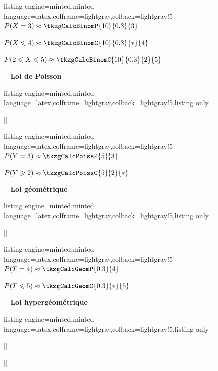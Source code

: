 \documentclass[11pt,a4paper]{ltxdoc}
\begin{document}
\begin{tcblisting}{listing engine=minted,minted language=latex,colframe=lightgray,colback=lightgray!5}
$P(X=3) \approx \tkzgCalcBinomP{10}{0.3}{3}$

$P(X \leqslant 4) \approx \tkzgCalcBinomC{10}{0.3}{*}{4}$

$P(2 \leqslant X \leqslant 5) \approx \tkzgCalcBinomC{10}{0.3}{2}{5}$
\end{tcblisting}

\textbf{-- Loi de Poisson}

\begin{tcblisting}{listing engine=minted,minted language=latex,colframe=lightgray,colback=lightgray!5,listing only}
[\macro]

[\macro]
\end{tcblisting}

\begin{tcblisting}{listing engine=minted,minted language=latex,colframe=lightgray,colback=lightgray!5}
$P(Y=3) \approx \tkzgCalcPoissP{5}{3}$

$P(Y \geqslant 2) \approx \tkzgCalcPoissC{5}{2}{*}$
\end{tcblisting}

\textbf{-- Loi géométrique}

\begin{tcblisting}{listing engine=minted,minted language=latex,colframe=lightgray,colback=lightgray!5,listing only}
[\macro]

[\macro]
\end{tcblisting}

\begin{tcblisting}{listing engine=minted,minted language=latex,colframe=lightgray,colback=lightgray!5}
$P(T=4) \approx \tkzgCalcGeomP{0.3}{4}$

$P(T \leqslant 5) \approx \tkzgCalcGeomC{0.3}{*}{5}$
\end{tcblisting}

\textbf{-- Loi hypergéométrique}

\begin{tcblisting}{listing engine=minted,minted language=latex,colframe=lightgray,colback=lightgray!5,listing only}

[\macro]

[\macro]
\end{tcblisting}
\end{document}
